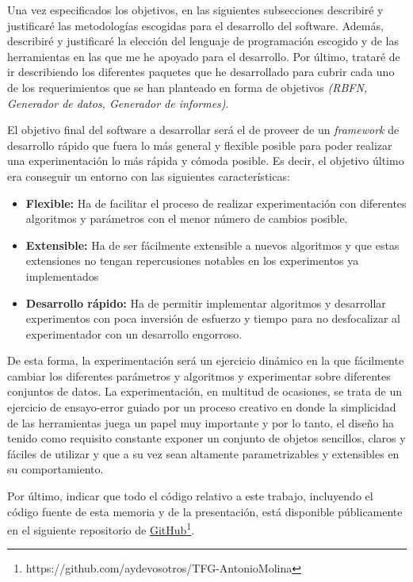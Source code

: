 \documentclass[10pt,a4paper]{report}
\begin{document}
Una vez especificados los objetivos, en las siguientes subsecciones describiré y justificaré las metodologías escogidas para el desarrollo del software. Además, describiré y justificaré la elección del lenguaje de programación escogido y de las herramientas en las que me he apoyado para el desarrollo. Por último, trataré de ir describiendo los diferentes paquetes que he desarrollado para cubrir cada uno de los requerimientos que se han planteado en forma de objetivos \textit{(RBFN, Generador de datos, Generador de informes)}.

El objetivo final del software a desarrollar será el de proveer de un \textit{framework} de desarrollo rápido que fuera lo más general y flexible posible para poder realizar una experimentación lo más rápida y cómoda posible. Es decir, el objetivo último era conseguir un entorno con las siguientes características:
\begin{itemize}
	\item \textbf{Flexible:} Ha de facilitar el proceso de realizar experimentación con diferentes algoritmos y parámetros con el menor número de cambios posible.
	\item \textbf{Extensible:} Ha de ser fácilmente extensible a nuevos algoritmos y que estas extensiones no tengan repercusiones notables en los experimentos ya implementados
	\item \textbf{Desarrollo rápido:} Ha de permitir implementar algoritmos y desarrollar experimentos con poca inversión de esfuerzo y tiempo para no desfocalizar al experimentador con un desarrollo engorroso.
\end{itemize}

De esta forma, la experimentación será un ejercicio dinámico en la que fácilmente cambiar los diferentes parámetros y algoritmos y experimentar sobre diferentes conjuntos de datos. La experimentación, en multitud de ocasiones, se trata de un ejercicio de ensayo-error guiado por un proceso creativo en donde la simplicidad de las herramientas juega un papel muy importante y por lo tanto, el diseño ha tenido como requisito constante exponer un conjunto de objetos sencillos, claros y fáciles de utilizar y que a su vez sean altamente parametrizables y extensibles en su comportamiento.

Por último, indicar que todo el código relativo a este trabajo, incluyendo el código fuente de esta memoria y de la presentación, está disponible públicamente en el siguiente repositorio de \href{https://github.com/aydevosotros/TFG-AntonioMolina}{GitHub}\footnote{https://github.com/aydevosotros/TFG-AntonioMolina}.
\end{document}
